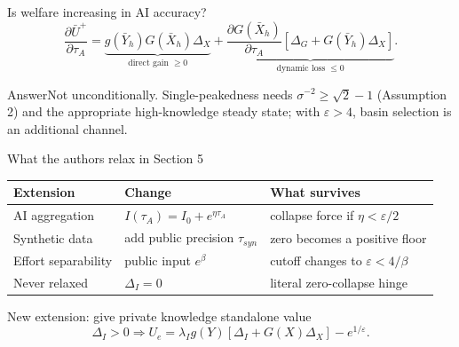 \documentclass[aspectratio=169,10pt]{beamer}
\begin{document}
\begin{frame}{Is welfare increasing in AI accuracy?}
\small
\[
\frac{\partial\bar U^+}{\partial\tau_A}=
\underbrace{g(\bar Y_h)G(\bar X_h)\Delta_X}_{\text{direct gain }\ge0}
+\underbrace{\frac{\partial G(\bar X_h)}{\partial\tau_A}
[\Delta_G+G(\bar Y_h)\Delta_X]}_{\text{dynamic loss }\le0}.
\]
\begin{alertblock}{Answer}Not unconditionally. Single-peakedness needs $\sigma^{-2}\ge\sqrt2-1$ (Assumption 2) and the appropriate high-knowledge steady state; with $\varepsilon>4$, basin selection is an additional channel.\end{alertblock}
\end{frame}

\begin{frame}{What the authors relax in Section 5}
\small
\begin{tabular}{@{}p{3.1cm}p{4.6cm}p{5.2cm}@{}}\toprule
Extension & Change & What survives\\\midrule
AI aggregation & $I(\tau_A)=I_0+e^{\eta\tau_A}$ & collapse force if $\eta<\varepsilon/2$\\
Synthetic data & add public precision $\tau_{syn}$ & zero becomes a positive floor\\
Effort separability & public input $e^\beta$ & cutoff changes to $\varepsilon<4/\beta$\\\midrule
Never relaxed & $\Delta_I=0$ & literal zero-collapse hinge\\\bottomrule
\end{tabular}
\end{frame}

\begin{frame}{New extension: give private knowledge standalone value}
\small
\[
\Delta_I>0\Rightarrow
U_e=\lambda_Ig(Y)[\Delta_I+G(X)\Delta_X]-e^{1/\varepsilon}.
\]
\begin{center}
\end{center}
\end{frame}
\end{document}
